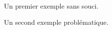 \documentclass[varwidth, border = 3pt]{standalone}
\begin{document}
Un premier exemple sans souci.


Un second exemple problématique.

\end{document}
